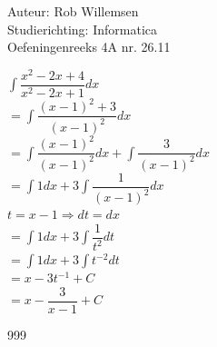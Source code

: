 \documentclass[a4paper]{article}
\newcommand{\dint}{\displaystyle\int}
\begin{document}
\noindent \large Auteur: Rob Willemsen \\
\noindent \large Studierichting: Informatica \\
\noindent \large Oefeningenreeks 4A nr. 26.11 \\

\medskip

\normalsize

$\dint \dfrac{x^2-2x+4}{x^2-2x+1} dx$ \\

$= \dint \dfrac{(x-1)^2+3}{(x-1)^2} dx$ \\

$= \dint \dfrac{(x-1)^2}{(x-1)^2}dx + \dint \dfrac{3}{(x-1)^2} dx$ \\

$= \dint 1 dx + 3 \dint \dfrac{1}{(x-1)^2} dx$ \\

$t = x - 1 \Rightarrow dt = dx$ \\

$= \dint 1 dx + 3 \dint \dfrac{1}{t^2} dt$ \\

$= \dint 1 dx + 3 \dint t^{-2} dt$ \\

$= x - 3t^{-1} + C$ \\

$= x - \dfrac{3}{x-1} + C$ \\

\begin{thebibliography}{999}
\end{thebibliography}
\end{document}
